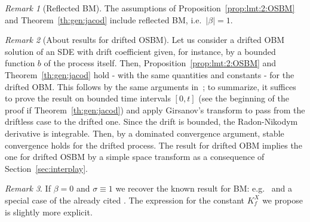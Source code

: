 \documentclass[12pt]{article}
\numberwithin{equation}{section}
\theoremstyle{definition}
\theoremstyle{remark}
\newtheorem{remark}{Remark}
\newcommand{\bfF}[1]{\mathbf{E}^X_{#1}}
\begin{document}
\begin{remark}[Reflected BM]
	The assumptions of Proposition~\ref{prop:lmt:2:OSBM} and Theorem~\ref{th:gen:jacod} include reflected BM, i.e.~$|\beta|=1$. 
\end{remark}


\begin{remark}[About results for drifted OSBM] \label{rem:drift}
	Let us consider a drifted OBM solution of an SDE with drift coefficient given, for instance, by a bounded function $b$ of the process itself. Then, Proposition~\ref{prop:lmt:2:OSBM} and Theorem~\ref{th:gen:jacod} hold - with the same quantities and constants - for the drifted OBM. This follows by the same arguments in~\cite[Section~2.4]{j1}; to summarize, it suffices to prove the result on bounded time intervals $[0,t]$ (see the beginning of the proof if Theorem~\ref{th:gen:jacod}) and apply Girsanov's transform to pass from the driftless case to the drifted one. Since the drift is bounded, the Radon-Nikodym derivative is integrable. Then, by a dominated convergence argument, stable convergence holds for the drifted process.
The result for drifted OBM implies the one for drifted OSBM by a simple space transform as a consequence of Section~\ref{sec:interplay}.
\end{remark}



\begin{remark} \label{rem:th:BM}
If $\beta=0$ and $\sigma\equiv 1$ we recover the known result for BM: e.g.~\cite{borodin86,borodin89} and a special case of the already cited \cite[Theorem~1.2]{j1}.
The expression for the constant $K_f^X$ we propose is slightly more explicit. 
\end{remark}
\end{document}
